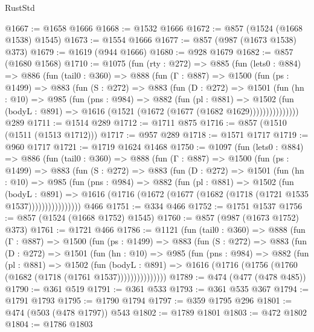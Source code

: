 \begin{lexlean}{RustStd}
\begin{coremodule}
{\begin{coremodule}
{{{{{{{{{@1667 := @1658 @1666
@1668 := @1532 @1666
@1672 := @857 (@1524 (@1668 @1538) @1545)
@1673 := @1554 @1666
@1677 := @857 (@987 (@1673 @1538) @373)
@1679 := @1619 (@944 @1666)
@1680 := @928 @1679
@1682 := @857 (@1680 @1568)
@1710 := @1075
    (fun (rty : @272) =>
    @885
      (fun (lets0 : @884) =>
      @886
        (fun (tail0 : @360) =>
        @888
          (fun (Γ : @887) =>
          @1500
            (fun (ps : @1499) =>
            @883
              (fun (S : @272) =>
              @883
                (fun (D : @272) =>
                @1501
                  (fun (hn : @10) =>
                  @985
                    (fun (pns : @984) =>
                    @882
                      (fun (pl : @881) =>
                      @1502
                        (fun (bodyL : @891) =>
                        @1616 (@1521 (@1672 (@1677 (@1682 @1629)))))))))))))))
    @289
@1711 := @1514 @289
@1712 := @1711 @875
@1716 := @857 (@1510 (@1511 (@1513 @1712)))
@1717 := @957 @289
@1718 := @1571 @1717
@1719 := @960 @1717
@1721 := @1719 @1624 @1468
@1750 := @1097
    (fun (lets0 : @884) =>
    @886
      (fun (tail0 : @360) =>
      @888
        (fun (Γ : @887) =>
        @1500
          (fun (ps : @1499) =>
          @883
            (fun (S : @272) =>
            @883
              (fun (D : @272) =>
              @1501
                (fun (hn : @10) =>
                @985
                  (fun (pns : @984) =>
                  @882
                    (fun (pl : @881) =>
                    @1502
                      (fun (bodyL : @891) =>
                      @1616 (@1716 (@1672 (@1677 (@1682 (@1718 (@1721 @1535 @1537))))))))))))))))
    @466
@1751 := @334 @466
@1752 := @1751 @1537
@1756 := @857 (@1524 (@1668 @1752) @1545)
@1760 := @857 (@987 (@1673 @1752) @373)
@1761 := @1721 @466
@1786 := @1121
    (fun (tail0 : @360) =>
    @888
      (fun (Γ : @887) =>
      @1500
        (fun (ps : @1499) =>
        @883
          (fun (S : @272) =>
          @883
            (fun (D : @272) =>
            @1501
              (fun (hn : @10) =>
              @985
                (fun (pns : @984) =>
                @882
                  (fun (pl : @881) =>
                  @1502
                    (fun (bodyL : @891) =>
                    @1616 (@1716 (@1756 (@1760 (@1682 (@1718 (@1761 @1537)))))))))))))))
@1789 := @474 (@477 (@478 @485))
@1790 := @361 @519
@1791 := @361 @533
@1793 := @361 @535 @367
@1794 := @1791 @1793
@1795 := @1790 @1794
@1797 := @359 @1795 @296
@1801 := @474 (@503 (@478 @1797)) @543
@1802 := @1789 @1801
@1803 := @472 @1802
@1804 := @1786 @1803
}}}}}}}}}
\end{coremodule}}
\end{coremodule}
\end{lexlean}
